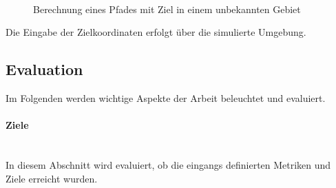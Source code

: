 \begin{enumerate}[leftmargin=*]
    \begin{figure}[H]
        \centering
        \\
        \caption{Berechnung eines Pfades mit Ziel in einem unbekannten Gebiet}
        \label{fig:pathfindingUnknown}
    \end{figure}

    Die Eingabe der Zielkoordinaten erfolgt über die simulierte Umgebung.
\end{enumerate}

\newpage
\subsection{Evaluation}
Im Folgenden werden wichtige Aspekte der Arbeit beleuchtet und evaluiert.

\paragraph{Ziele} \mbox{}\\
In diesem Abschnitt wird evaluiert, ob die eingangs definierten Metriken und Ziele erreicht wurden.

